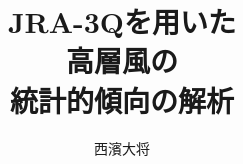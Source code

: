 \documentclass[12pt,aspectratio=169,t]{beamer}
\title{JRA-3Qを用いた\\高層風の\\統計的傾向の解析}
\author{西濱大将}
\date{}
\begin{document}
\titleframe

















\end{document}
